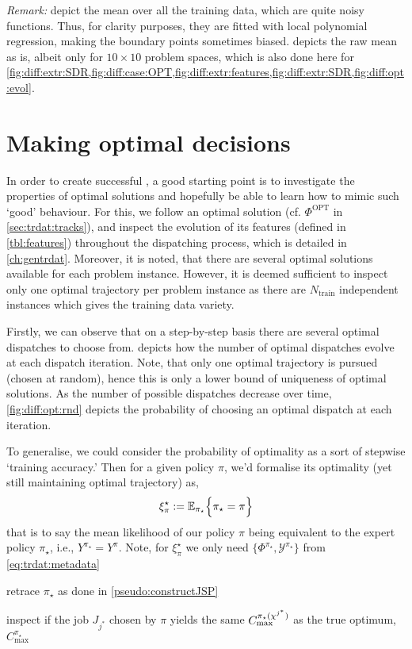 \emph{Remark:}  
depict the mean over all the training data, which are quite noisy 
functions. Thus, for clarity purposes, they are fitted with local polynomial 
regression, making the boundary points sometimes biased. 
 depicts the raw mean as is, albeit only for $10\times10$ problem 
spaces, which is also done here for 
\cref{fig:diff:extr:SDR,fig:diff:case:OPT,fig:diff:extr:features,fig:diff:extr:SDR,fig:diff:opt:evol}.

\section{Making optimal decisions}
In order to create successful \dr, a good starting point is 
to investigate the properties of optimal solutions and hopefully be able to 
learn how to mimic such `good' behaviour. 
For this, we follow an optimal solution (cf. $\Phi^\text{OPT}$ in 
\cref{sec:trdat:tracks}),
and inspect the evolution of its features  (defined in \cref{tbl:features}) 
throughout the dispatching process, which is detailed in \cref{ch:gentrdat}. 
Moreover, it is noted, that there are several optimal solutions available for 
each problem instance. However, it is deemed sufficient to inspect only one 
optimal trajectory per problem instance as there are $N_{\text{train}}$ 
independent instances which gives the training data variety. 

Firstly, we can observe that on a step-by-step basis there are several optimal 
dispatches to choose from.  depicts how the number of 
optimal dispatches evolve at each dispatch iteration. Note, that only one 
optimal trajectory is pursued (chosen at random), hence this is only a lower 
bound of uniqueness of optimal solutions.
As the number of possible dispatches decrease over time, 
\cref{fig:diff:opt:rnd} 
depicts the probability of choosing an optimal dispatch at each iteration. 

To generalise, we could consider the probability of optimality as a sort of 
stepwise `training accuracy.' Then for a given policy $\pi$, we'd formalise its 
optimality (yet still maintaining optimal trajectory) as, 
\begin{equation} \label{eq:tracc:opt}
    \xi^\star_{\pi} := \Exp[\pi_{\star}]{\pi_{\star} = \pi}
\end{equation}
that is to say the mean likelihood of our policy $\pi$ being equivalent to the 
expert policy $\pi_\star$, i.e., $Y^{\pi_\star}=Y^\pi$. Note, for 
$\xi^\star_\pi$ we 
only need $\{\Phi^{\pi_\star},\mathcal{Y}^{\pi_\star}\}$ from 
\cref{eq:trdat:metadata}
\begin{enumerate*}
    \item retrace $\pi_\star$ as done in \cref{pseudo:constructJSP}
    \item inspect if the job $J_{j^*}$ chosen by $\pi$ yields the same 
    $C_{\max}^{\pi_\star({\mathbf{\chi}}^{j^*})}$ as the true optimum, 
    $C_{\max}^{\pi_\star}$
\end{enumerate*}

